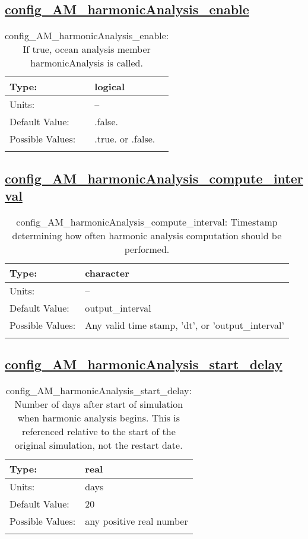 \subsection[config\_AM\_harmonicAnalysis\_enable]{\hyperref[sec:nm_tab_AM_harmonicAnalysis]{config\_AM\_harmonicAnalysis\_enable}}
\label{subsec:nm_sec_config_AM_harmonicAnalysis_enable}
\begin{center}
\begin{longtable}{| p{2.0in} || p{4.0in} |}
    \hline
    Type: & logical \\
    \hline
    Units: & -- \\
    \hline
    Default Value: & .false. \\
    \hline
    Possible Values: & .true. or .false. \\
    \hline
    \caption{config\_AM\_harmonicAnalysis\_enable: If true, ocean analysis member harmonicAnalysis is called.}
\end{longtable}
\end{center}
\subsection[config\_AM\_harmonicAnalysis\_compute\_interval]{\hyperref[sec:nm_tab_AM_harmonicAnalysis]{config\_AM\_harmonicAnalysis\_compute\_interval}}
\label{subsec:nm_sec_config_AM_harmonicAnalysis_compute_interval}
\begin{center}
\begin{longtable}{| p{2.0in} || p{4.0in} |}
    \hline
    Type: & character \\
    \hline
    Units: & -- \\
    \hline
    Default Value: & output\_interval \\
    \hline
    Possible Values: & Any valid time stamp, 'dt', or 'output\_interval' \\
    \hline
    \caption{config\_AM\_harmonicAnalysis\_compute\_interval: Timestamp determining how often harmonic analysis computation should be performed.}
\end{longtable}
\end{center}
\subsection[config\_AM\_harmonicAnalysis\_start\_delay]{\hyperref[sec:nm_tab_AM_harmonicAnalysis]{config\_AM\_harmonicAnalysis\_start\_delay}}
\label{subsec:nm_sec_config_AM_harmonicAnalysis_start_delay}
\begin{center}
\begin{longtable}{| p{2.0in} || p{4.0in} |}
    \hline
    Type: & real \\
    \hline
    Units: & \si{days} \\
    \hline
    Default Value: & 20 \\
    \hline
    Possible Values: & any positive real number \\
    \hline
    \caption{config\_AM\_harmonicAnalysis\_start\_delay: Number of days after start of simulation when harmonic analysis begins. This is referenced relative to the start of the original simulation, not the restart date.}
\end{longtable}
\end{center}
